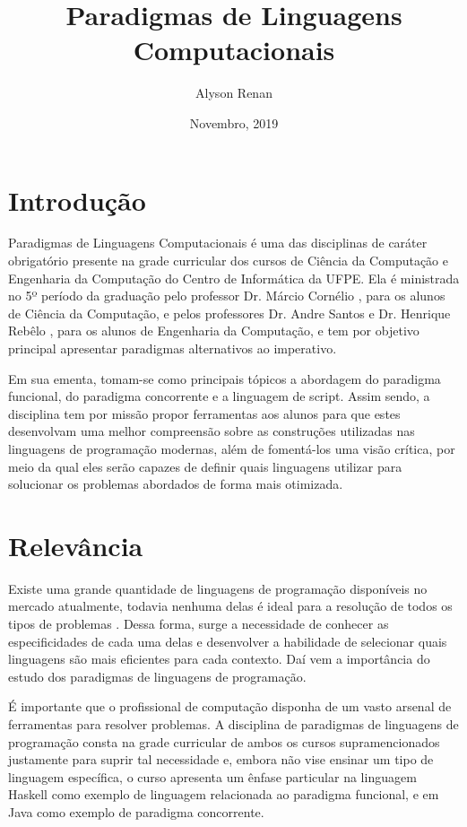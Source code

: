 \documentclass[10pt]{article}
\title{Paradigmas de Linguagens Computacionais}
\author{Alyson Renan}
\date{Novembro, 2019}
\begin{document}
\maketitle

\section{Introdução}
\justify
Paradigmas de Linguagens Computacionais é uma das disciplinas de caráter obrigatório presente na grade curricular dos cursos de Ciência da Computação\cite{ccClassPage} e Engenharia da Computação\cite{ecClassPage} do Centro de Informática da UFPE. Ela é ministrada no 5º período da graduação pelo professor Dr. Márcio Cornélio \cite{cornelioLattes}, para os alunos de Ciência da Computação, e pelos professores Dr. Andre Santos \cite{santosLattes} e Dr. Henrique Rebêlo \cite{rebeloLattes}, para os alunos de Engenharia da Computação, e tem por objetivo principal apresentar paradigmas alternativos ao imperativo.

\justify
Em sua ementa, tomam-se como principais tópicos a abordagem do paradigma funcional, do paradigma concorrente e a linguagem de script. Assim sendo, a disciplina tem por missão propor ferramentas aos alunos para que estes desenvolvam uma melhor compreensão sobre as construções utilizadas nas linguagens de programação modernas, além de fomentá-los uma visão crítica, por meio da qual eles serão capazes de definir quais linguagens utilizar para solucionar os problemas abordados de forma mais otimizada.

\section{Relevância}
\justify
Existe uma grande quantidade de linguagens de programação disponíveis no mercado atualmente, todavia nenhuma delas é ideal para a resolução de todos os tipos de problemas \cite{castroClass}. Dessa forma, surge a necessidade de conhecer as especificidades de cada uma delas e desenvolver a habilidade de selecionar quais linguagens são mais eficientes para cada contexto. Daí vem a importância do estudo dos paradigmas de linguagens de programação.

\justify
É importante que o profissional de computação disponha de um vasto arsenal de ferramentas para resolver problemas. A disciplina de paradigmas de linguagens de programação consta na grade curricular de ambos os cursos supramencionados justamente para suprir tal necessidade e, embora não vise ensinar um tipo de linguagem específica, o curso apresenta um ênfase particular na linguagem Haskell como exemplo de linguagem relacionada ao paradigma funcional, e em Java como exemplo de paradigma concorrente.
\end{document}
